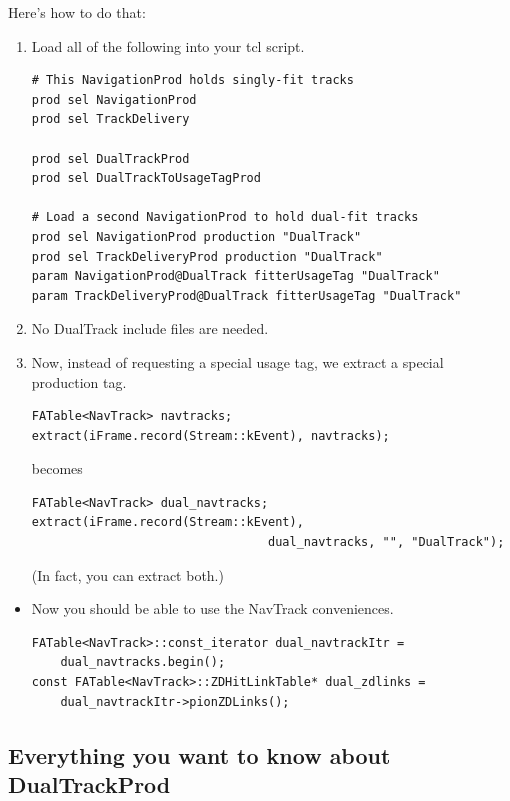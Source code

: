 \documentclass[12pt]{article}
\begin{document}
\pagebreak
Here's how to do that:
\begin{enumerate}

  \item Load all of the following into your tcl script.
\begin{verbatim}# This NavigationProd holds singly-fit tracks
prod sel NavigationProd
prod sel TrackDelivery

prod sel DualTrackProd
prod sel DualTrackToUsageTagProd

# Load a second NavigationProd to hold dual-fit tracks
prod sel NavigationProd production "DualTrack"
prod sel TrackDeliveryProd production "DualTrack"
param NavigationProd@DualTrack fitterUsageTag "DualTrack"
param TrackDeliveryProd@DualTrack fitterUsageTag "DualTrack" \end{verbatim}

  \item No DualTrack include files are needed.

  \item Now, instead of requesting a special usage tag, we extract a
  special production tag.
\begin{verbatim}FATable<NavTrack> navtracks;
extract(iFrame.record(Stream::kEvent), navtracks); \end{verbatim}
  becomes
\begin{verbatim}FATable<NavTrack> dual_navtracks;
extract(iFrame.record(Stream::kEvent),
                                 dual_navtracks, "", "DualTrack"); \end{verbatim}
  (In fact, you can extract both.)

\end{enumerate} \begin{itemize}

  \item Now you should be able to use the NavTrack conveniences.
\begin{verbatim}FATable<NavTrack>::const_iterator dual_navtrackItr =
    dual_navtracks.begin();
const FATable<NavTrack>::ZDHitLinkTable* dual_zdlinks =
    dual_navtrackItr->pionZDLinks(); \end{verbatim}

\end{itemize}

\subsection{Everything you want to know about DualTrackProd}
\end{document}
